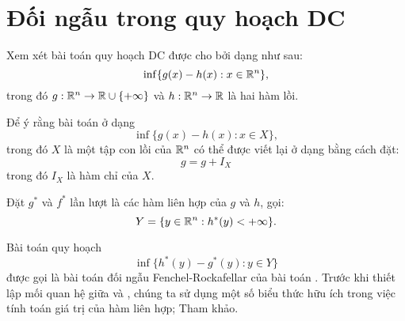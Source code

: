 \documentclass[a4paper]{report}
\begin{document}
    \section{Đối ngẫu trong quy hoạch DC}

    Xem xét bài toán quy hoạch DC được cho bởi dạng như sau:
    \begin{equation}
        \label{eq:dc_programming_gh_convex_2}
        \inf\{g(x) - h(x): x \in {\ensuremath{\mathbb{R}}^n}\},
    \end{equation}
    trong đó $g: \mathbb{R}^n \rightarrow \mathbb{R} \cup \{+\infty\}$ và $h: \mathbb{R}^n \rightarrow \mathbb{R}$ là hai hàm lồi. 
    
    Để ý rằng bài toán ở dạng 
    \begin{equation}
        \inf\{g(x) - h(x): x \in {X}\},
    \end{equation}
    trong đó $X$ là một tập con lồi của $\mathbb{R}^n$ có thể được viết lại ở dạng  bằng cách đặt:
    \begin{equation}
        g = g + I_X 
    \end{equation}
    trong đó $I_X$ là hàm chỉ của $X$.

    Đặt $g^*$ và $f^*$ lần lượt là các hàm liên hợp của $g$ và $h$, gọi:
    \begin{equation}
        \label{eq:conjugate_set}
        Y = \{y \in \mathbb{R}^n: h^*(y) < +\infty\}.
    \end{equation}

    Bài toán quy hoạch 
    \begin{equation}
        \label{eq:dc_programming_fenchel_rockafellar}
        \inf\{h^*(y) - g^*(y): y \in Y\}
    \end{equation}
    được gọi là bài toán đối ngẫu Fenchel-Rockafellar của bài toán . Trước khi thiết lập mối quan hệ giữa  và , chúng ta sử dụng một số biểu thức hữu ích trong việc tính toán giá trị của hàm liên hợp; Tham khảo.
\end{document}
